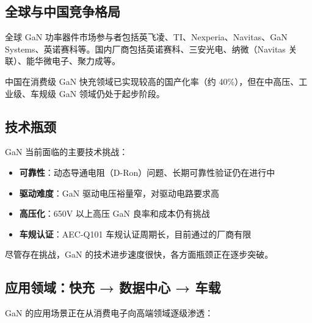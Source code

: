 \subsection{全球与中国竞争格局}

全球 GaN 功率器件市场参与者包括英飞凌、TI、Nexperia、Navitas、GaN Systems、英诺赛科等。国内厂商包括英诺赛科、三安光电、纳微（Navitas 关联）、能华微电子、聚力成等。

中国在消费级 GaN 快充领域已实现较高的国产化率（约 40\%），但在中高压、工业级、车规级 GaN 领域仍处于起步阶段。

\subsection{技术瓶颈}

GaN 当前面临的主要技术挑战：

\begin{itemize}[leftmargin=2em]
\item \textbf{可靠性}：动态导通电阻（D-Ron）问题、长期可靠性验证仍在进行中
\item \textbf{驱动难度}：GaN 驱动电压裕量窄，对驱动电路要求高
\item \textbf{高压化}：650V 以上高压 GaN 良率和成本仍有挑战
\item \textbf{车规认证}：AEC-Q101 车规认证周期长，目前通过的厂商有限
\end{itemize}

尽管存在挑战，GaN 的技术进步速度很快，各方面瓶颈正在逐步突破。

\subsection{应用领域：快充 → 数据中心 → 车载}

GaN 的应用场景正在从消费电子向高端领域逐级渗透：

